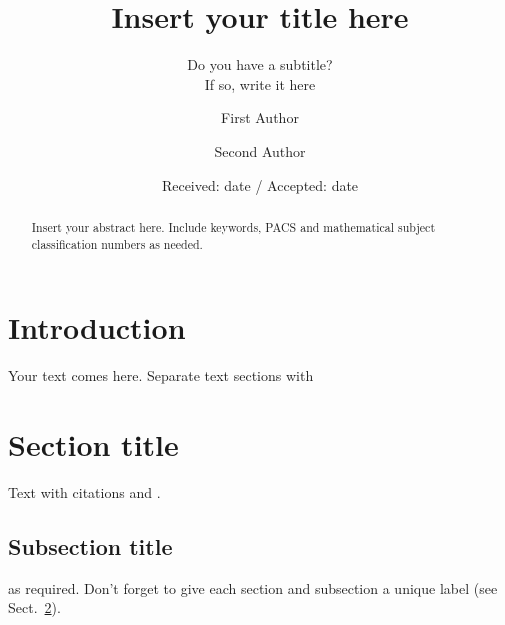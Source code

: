 \documentclass[smallextended]{svjour3}       %
\begin{document}
\title{Insert your title here%
}
\subtitle{Do you have a subtitle?\\ If so, write it here}


\author{First Author         \and
        Second Author %
}



\date{Received: date / Accepted: date}


\maketitle

\begin{abstract}
Insert your abstract here. Include keywords, PACS and mathematical
subject classification numbers as needed.
\end{abstract}

\section{Introduction}
\label{intro}
Your text comes here. Separate text sections with
\section{Section title}
\label{sec:1}
Text with citations \cite{RefB} and \cite{RefJ}.
\subsection{Subsection title}
\label{sec:2}
as required. Don't forget to give each section
and subsection a unique label (see Sect.~\ref{sec:1}).
\end{document}
